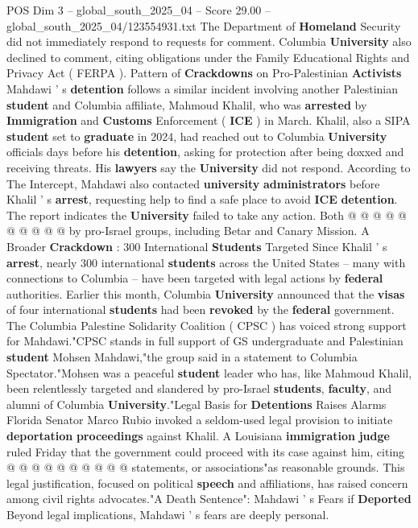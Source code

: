 \begin{textsample}{POS Dim 3 – global\_south\_2025\_04 – Score 29.00 – global\_south\_2025\_04/123554931.txt}
The Department of \textbf{Homeland} Security did not immediately respond to requests for comment.
Columbia \textbf{University} also declined to comment, citing obligations under the Family Educational Rights and Privacy Act ( FERPA ).
Pattern of \textbf{Crackdowns} on Pro-Palestinian \textbf{Activists} Mahdawi ' s \textbf{detention} follows a similar incident involving another Palestinian \textbf{student} and Columbia affiliate, Mahmoud Khalil, who was \textbf{arrested} by \textbf{Immigration} and \textbf{Customs} Enforcement ( \textbf{ICE} ) in March.
Khalil, also a SIPA \textbf{student} set to \textbf{graduate} in 2024, had reached out to Columbia \textbf{University} officials days before his \textbf{detention}, asking for protection after being doxxed and receiving threats.
His \textbf{lawyers} say the \textbf{University} did not respond.
According to The Intercept, Mahdawi also contacted \textbf{university} \textbf{administrators} before Khalil ' s \textbf{arrest}, requesting help to find a safe place to avoid \textbf{ICE} \textbf{detention}.
The report indicates the \textbf{University} failed to take any action.
Both @ @ @ @ @ @ @ @ @ @ by pro-Israel groups, including Betar and Canary Mission.
A Broader \textbf{Crackdown} : 300 International \textbf{Students} Targeted Since Khalil ' s \textbf{arrest}, nearly 300 international \textbf{students} across the United States -- many with connections to Columbia -- have been targeted with legal actions by \textbf{federal} authorities.
Earlier this month, Columbia \textbf{University} announced that the \textbf{visas} of four international \textbf{students} had been \textbf{revoked} by the \textbf{federal} government.
The Columbia Palestine Solidarity Coalition ( CPSC ) has voiced strong support for Mahdawi."CPSC stands in full support of GS undergraduate and Palestinian \textbf{student} Mohsen Mahdawi,"the group said in a statement to Columbia Spectator."Mohsen was a peaceful \textbf{student} leader who has, like Mahmoud Khalil, been relentlessly targeted and slandered by pro-Israel \textbf{students}, \textbf{faculty}, and alumni of Columbia \textbf{University}."Legal Basis for \textbf{Detentions} Raises Alarms Florida Senator Marco Rubio invoked a seldom-used legal provision to initiate \textbf{deportation} \textbf{proceedings} against Khalil.
A Louisiana \textbf{immigration} \textbf{judge} ruled Friday that the government could proceed with its case against him, citing @ @ @ @ @ @ @ @ @ @ statements, or associations"as reasonable grounds.
This legal justification, focused on political \textbf{speech} and affiliations, has raised concern among civil rights advocates."A Death Sentence": Mahdawi ' s Fears if \textbf{Deported} Beyond legal implications, Mahdawi ' s fears are deeply personal.

\end{textsample}
